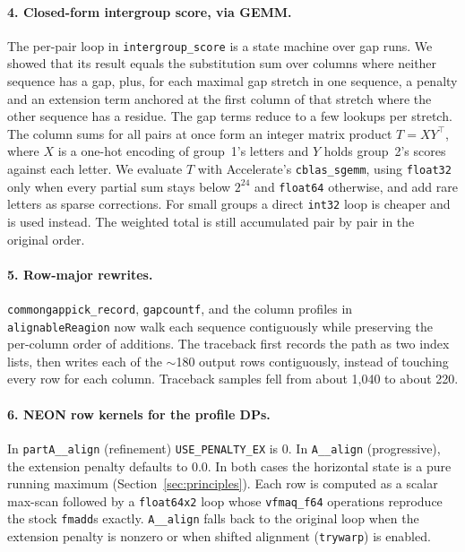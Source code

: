 \documentclass[11pt]{article}
\newcommand{\code}[1]{\texttt{#1}}
\begin{document}
\paragraph{4. Closed-form intergroup score, via GEMM.} The per-pair loop in
\code{intergroup\_score} is a state machine over gap runs. We showed that its result equals
the substitution sum over columns where neither sequence has a gap, plus, for each maximal
gap stretch in one sequence, a penalty and an extension term anchored at the first column
of that stretch where the other sequence has a residue. The gap terms reduce to a few
lookups per stretch. The column sums for all pairs at once form an integer matrix product
$T = XY^{\top}$, where $X$ is a one-hot encoding of group~1's letters and $Y$ holds group~2's
scores against each letter. We evaluate $T$ with Accelerate's \code{cblas\_sgemm}, using
\code{float32} only when every partial sum stays below $2^{24}$ and \code{float64}
otherwise, and add rare letters as sparse corrections. For small groups a direct
\code{int32} loop is cheaper and is used instead. The weighted total is still accumulated
pair by pair in the original order.

\paragraph{5. Row-major rewrites.} \code{commongappick\_record}, \code{gapcountf}, and the
column profiles in \code{alignableReagion} now walk each sequence contiguously while
preserving the per-column order of additions. The traceback first records the path as two
index lists, then writes each of the $\sim$180 output rows contiguously, instead of
touching every row for each column. Traceback samples fell from about 1{,}040 to about 220.

\paragraph{6. NEON row kernels for the profile DPs.} In \code{partA\_\_align} (refinement)
\code{USE\_PENALTY\_EX} is 0. In \code{A\_\_align} (progressive), the extension penalty
defaults to $0.0$. In both cases the horizontal state is a pure running maximum
(Section~\ref{sec:principles}). Each row is computed as a scalar max-scan followed by a
\code{float64x2} loop whose \code{vfmaq\_f64} operations reproduce the stock \code{fmadd}s
exactly. \code{A\_\_align} falls back to the original loop when the extension penalty is
nonzero or when shifted alignment (\code{trywarp}) is enabled.
\end{document}

